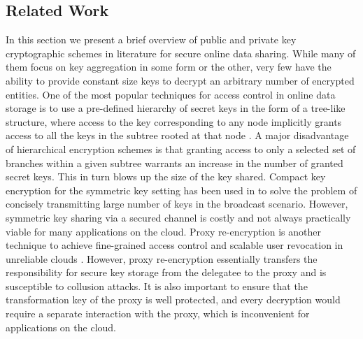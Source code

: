 \subsection{Related Work}
\label{subsec:relatedwork}

In this section we present a brief overview of public and private key cryptographic schemes in literature for secure online data sharing. While many of them focus on key aggregation in some form or the other, very few have the ability to provide constant size keys to decrypt an arbitrary number of encrypted entities. One of the most popular techniques for access control in online data storage is to use a pre-defined hierarchy of secret keys in the form of a tree-like structure, where access to the key corresponding to any node implicitly grants access to all the keys in the subtree rooted at that node \cite{tzeng2002time,ateniese2012provably,sandhu1988cryptographic,sun2004scalable,atallah2009dynamic,ateniese2012provably}. A major disadvantage of hierarchical encryption schemes is that granting access to only a selected set of branches within a given subtree warrants an increase in the number of granted secret keys. This in turn blows up the size of the key shared. Compact key encryption for the symmetric key setting has been used in \cite{benaloh2009patient} to solve the problem of concisely transmitting  large number of keys in the broadcast scenario. However, symmetric key sharing via a secured channel is costly and not always practically viable for many applications on the cloud. Proxy re-encryption is another technique to achieve fine-grained access control and scalable user revocation in unreliable clouds \cite{ateniese2006improved,liu2011reliable}. However, proxy re-encryption essentially transfers the responsibility for secure key storage from the delegatee to the proxy and is susceptible to collusion attacks. It is also important to ensure that the transformation key of the proxy is well protected, and every decryption would require a separate interaction with the proxy, which is inconvenient for applications on the cloud.



